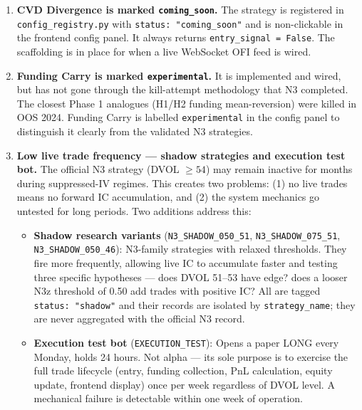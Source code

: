 \documentclass[11pt,a4paper]{article}
\newcommand{\code}[1]{\texttt{#1}}
\begin{document}
\begin{enumerate}
  \item \textbf{CVD Divergence is marked \code{coming\_soon}.} The strategy is registered in \code{config\_registry.py} with \code{status: "coming\_soon"} and is non-clickable in the frontend config panel. It always returns \code{entry\_signal = False}. The scaffolding is in place for when a live WebSocket OFI feed is wired.

  \item \textbf{Funding Carry is marked \code{experimental}.} It is implemented and wired, but has not gone through the kill-attempt methodology that N3 completed. The closest Phase 1 analogues (H1/H2 funding mean-reversion) were killed in OOS 2024. Funding Carry is labelled \code{experimental} in the config panel to distinguish it clearly from the validated N3 strategies.

  \item \textbf{Low live trade frequency --- shadow strategies and execution test bot.}
  The official N3 strategy (DVOL $\geq 54$) may remain inactive for months during suppressed-IV regimes. This creates two problems: (1) no live trades means no forward IC accumulation, and (2) the system mechanics go untested for long periods. Two additions address this:

  \begin{itemize}[noitemsep]
    \item \textbf{Shadow research variants} (\code{N3\_SHADOW\_050\_51}, \code{N3\_SHADOW\_075\_51}, \code{N3\_SHADOW\_050\_46}): N3-family strategies with relaxed thresholds. They fire more frequently, allowing live IC to accumulate faster and testing three specific hypotheses --- does DVOL 51--53 have edge? does a looser N3z threshold of 0.50 add trades with positive IC? All are tagged \code{status: "shadow"} and their records are isolated by \code{strategy\_name}; they are never aggregated with the official N3 record.

    \item \textbf{Execution test bot} (\code{EXECUTION\_TEST}): Opens a paper LONG every Monday, holds 24 hours. Not alpha --- its sole purpose is to exercise the full trade lifecycle (entry, funding collection, PnL calculation, equity update, frontend display) once per week regardless of DVOL level. A mechanical failure is detectable within one week of operation.
  \end{itemize}


\end{enumerate}
\end{document}
